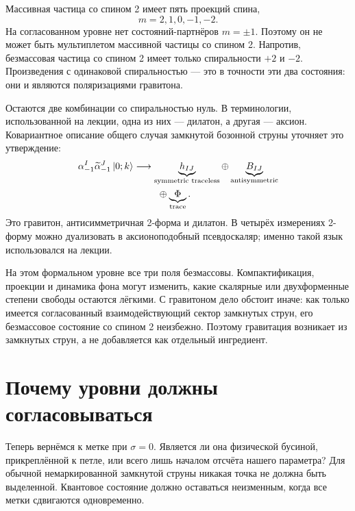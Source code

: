 Массивная частица со спином 2 имеет пять проекций спина,
\begin{equation}
  m=2,1,0,-1,-2.
\end{equation}
На согласованном уровне нет состояний-партнёров \(m=\pm1\). Поэтому он не может быть мультиплетом массивной частицы со спином 2. Напротив, безмассовая частица со спином 2 имеет только спиральности \(+2\) и \(-2\). Произведения с одинаковой спиральностью — это в точности эти два состояния: они и являются поляризациями гравитона.

Остаются две комбинации со спиральностью нуль. В терминологии, использованной на лекции, одна из них — дилатон, а другая — аксион. Ковариантное описание общего случая замкнутой бозонной струны уточняет это утверждение:
\begin{equation}
  \begin{aligned}
    \alpha_{-1}^{I}\widetilde\alpha_{-1}^{J}\left\lvert0;k\right\rangle
    &\longrightarrow
    \underbrace{h_{IJ}}_{\text{symmetric traceless}}
    \oplus
    \underbrace{B_{IJ}}_{\text{antisymmetric}}\\
    &\hspace{2.5em}\oplus
    \underbrace{\Phi}_{\text{trace}}.
  \end{aligned}
  \label{eq:l04-massless-tensor-decomposition}
\end{equation}
Это гравитон, антисимметричная 2-форма и дилатон. В четырёх измерениях 2-форму можно дуализовать в аксионоподобный псевдоскаляр; именно такой язык использовался на лекции.

На этом формальном уровне все три поля безмассовы. Компактификация, проекции и динамика фона могут изменить, какие скалярные или двухформенные степени свободы остаются лёгкими. С гравитоном дело обстоит иначе: как только имеется согласованный взаимодействующий сектор замкнутых струн, его безмассовое состояние со спином 2 неизбежно. Поэтому гравитация возникает из замкнутых струн, а не добавляется как отдельный ингредиент.

\section{Почему уровни должны согласовываться}

Теперь вернёмся к метке при \(\sigma=0\). Является ли она физической бусиной, прикреплённой к петле, или всего лишь началом отсчёта нашего параметра? Для обычной немаркированной замкнутой струны никакая точка не должна быть выделенной. Квантовое состояние должно оставаться неизменным, когда все метки сдвигаются одновременно.

